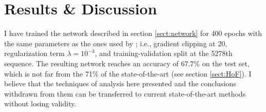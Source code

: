 \chapter{Results \& Discussion} \label{Chapter: Results}







I have trained the network described in section \ref{sect:network} for 400 epochs with the same parameters as the ones used by \cite{Jurtz2017}; i.e., gradient clipping at 20, regularization term $\lambda=10^{-3}$, and training-validation split at the 5278th sequence. The resulting network reaches an accuracy of 67.7\% on the test set, which is not far from the 71\% of the state-of-the-art (see section \ref{sect:HoF}).
I believe that the techniques of analysis here presented and the conclusions withdrawn from them can be transferred to current state-of-the-art methods without losing validity.

